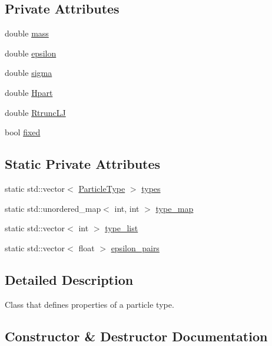 \subsection*{Private Attributes}
\begin{DoxyCompactItemize}
\item 
double \hyperlink{classParticleType_a50e29ce810f7695975cd1783fc39d123}{mass}
\item 
double \hyperlink{classParticleType_a7f7401600e63f6445ebc74ca001d7e2f}{epsilon}
\item 
double \hyperlink{classParticleType_a25ee646610c406b46d8eb12b40c22702}{sigma}
\item 
double \hyperlink{classParticleType_aae4f7e0cd2265895a5bafaff24b443fb}{Hpart}
\item 
double \hyperlink{classParticleType_a5bcb4a735490f24a0c764e7a866ef39f}{Rtrunc\+LJ}
\item 
bool \hyperlink{classParticleType_acfda1ab133ca64961b06074acff72897}{fixed}
\end{DoxyCompactItemize}
\subsection*{Static Private Attributes}
\begin{DoxyCompactItemize}
\item 
static std\+::vector$<$ \hyperlink{classParticleType}{Particle\+Type} $>$ \hyperlink{classParticleType_a6a8be2f8b725af22c139c4066561b659}{types}
\item 
static std\+::unordered\+\_\+map$<$ int, int $>$ \hyperlink{classParticleType_a86aad107a375f2c8fd89829b7cc1f169}{type\+\_\+map}
\item 
static std\+::vector$<$ int $>$ \hyperlink{classParticleType_a6f874a186f9da4da7ca9f9aac65b355a}{type\+\_\+list}
\item 
static std\+::vector$<$ float $>$ \hyperlink{classParticleType_a143dfdb6d3408d5f4f710e5ccc9e0c49}{epsilon\+\_\+pairs}
\end{DoxyCompactItemize}


\subsection{Detailed Description}
Class that defines properties of a particle type. 



\subsection{Constructor \& Destructor Documentation}
